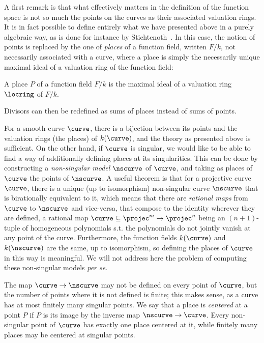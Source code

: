 A first remark is that what effectively matters in the definition of the function space is not so much the points on the curves as their associated valuation
rings. It is in fact possible to define entirely what we have presented above in a purely algebraic way, as is done for instance by Stichtenoth~\cite{stichtenoth}.
In this case, the notion of points is replaced by the one of \emph{places} of a function field, written $F/k$, not necessarily associated with a curve, where a place is simply the necessarily unique maximal
ideal of a valuation ring of the function field:

\begin{defi}
A place $P$ of a function field $F/k$ is the maximal ideal of a valuation ring $\locring$ of $F/k$.
\end{defi}

Divisors can then be redefined as sums of places instead of sums of points.

For a smooth curve $\curve$, there is a bijection between its points and the valuation rings (the places) of $k(\curve)$, and the theory as presented above is sufficient.
On the other hand, if $\curve$ is singular, we would like to be able to find a way of additionally defining places at its singularities.
This can be done by constructing a \emph{non-singular model} $\nscurve$ of $\curve$,
and taking as places of $\curve$ the points of $\nscurve$. A useful theorem is that for a projective curve $\curve$, there is a unique (up to isomorphism) non-singular curve
$\nscurve$ that is birationally equivalent to it, which means that there are \emph{rational maps} from $\curve$ to $\nscurve$ and vice-versa, that compose to the identity wherever they are
defined,
a rational map $\curve \subseteq \projec^m \rightarrow \projec^n$ being an $(n+1)$-tuple of homogeneous polynomials s.t. the polynomials do not jointly
vanish at any point of the curve. Furthermore, the function fields $k(\curve)$ and $k(\nscurve)$ are the same, up to isomorphism, so defining the places of $\curve$ in this
way is meaningful.
We will not address here the problem of computing these non-singular models \emph{per se}.

The map $\curve \rightarrow \nscurve$ may not be defined on every point of $\curve$, but the number of points where it is not defined is finite; this makes sense, as a curve
has at most finitely many singular points. We say that a place is \emph{centered} at a point $P$ if $P$ is its image by the inverse map $\nscurve \rightarrow \curve$.
Every non-singular
point of $\curve$ has exactly one place centered at it, while finitely many places may be centered at singular points.

